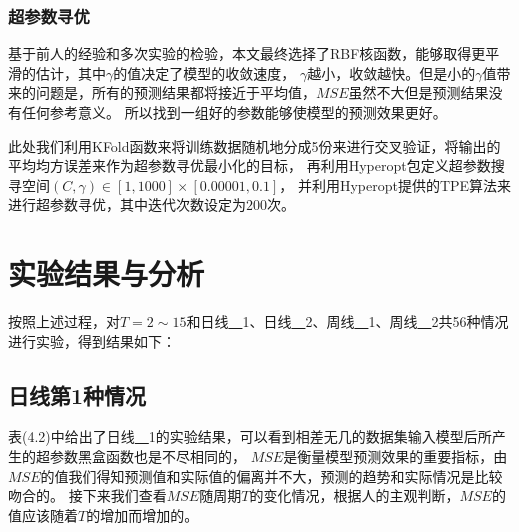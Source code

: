 \subsubsection{超参数寻优}

基于前人的经验和多次实验的检验，本文最终选择了RBF核函数，能够取得更平滑的估计，其中$\gamma$的值决定了模型的收敛速度，
$\gamma$越小，收敛越快。但是小的$\gamma$值带来的问题是，所有的预测结果都将接近于平均值，$MSE$虽然不大但是预测结果没有任何参考意义。
所以找到一组好的参数能够使模型的预测效果更好。

此处我们利用KFold函数来将训练数据随机地分成5份来进行交叉验证，将输出的平均均方误差来作为超参数寻优最小化的目标，
再利用Hyperopt包定义超参数搜寻空间$(C,\gamma)\in[1, 1000]\times[0.00001, 0.1]$，
并利用Hyperopt提供的TPE算法来进行超参数寻优，其中迭代次数设定为$200$次。

\section{实验结果与分析}

按照上述过程，对$T=2\sim15$和日线\underline{~~}1、日线\underline{~~}2、周线\underline{~~}1、周线\underline{~~}2共56种情况进行实验，得到结果如下：

\subsection{日线第1种情况}

表(4.2)中给出了日线\underline{~~}1的实验结果，可以看到相差无几的数据集输入模型后所产生的超参数黑盒函数也是不尽相同的，
$MSE$是衡量模型预测效果的重要指标，由$MSE$的值我们得知预测值和实际值的偏离并不大，预测的趋势和实际情况是比较吻合的。
接下来我们查看$MSE$随周期$T$的变化情况，根据人的主观判断，$MSE$的值应该随着$T$的增加而增加的。

